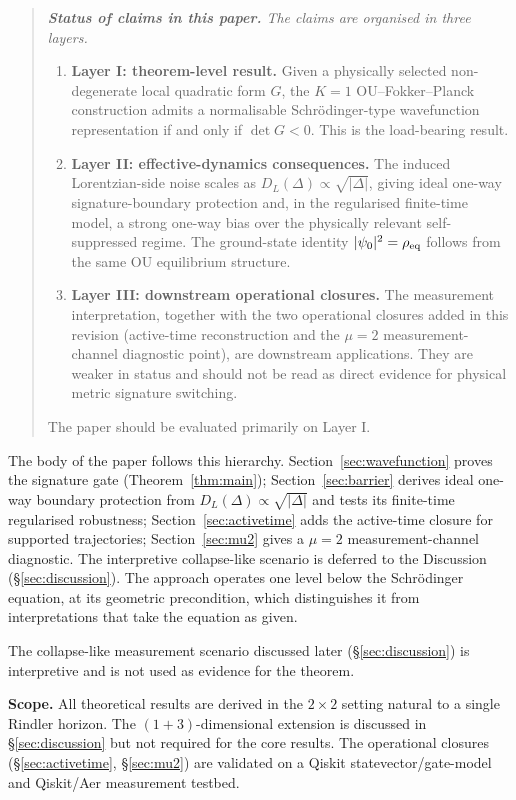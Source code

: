 \documentclass[11pt,a4paper]{article}
\theoremstyle{definition}
\begin{document}
\begin{quote}
\itshape
\textbf{Status of claims in this paper.}
The claims are organised in three layers.
\begin{enumerate}
\item \textbf{Layer I: theorem-level result.}
Given a physically selected non-degenerate local quadratic form $G$,
the $K{=}1$ OU--Fokker--Planck construction admits a normalisable
Schr\"odinger-type wavefunction representation if and only if
$\det G<0$. This is the load-bearing result.
\item \textbf{Layer II: effective-dynamics consequences.}
The induced Lorentzian-side noise scales as
$D_L(\Delta)\propto\sqrt{|\Delta|}$, giving ideal one-way
signature-boundary protection and, in the regularised finite-time model, a
strong one-way bias over the physically relevant self-suppressed regime.
The ground-state identity $|\psi_0|^2=\rho_{\rm eq}$ follows from the
same OU equilibrium structure.
\item \textbf{Layer III: downstream operational closures.}
The measurement interpretation, together with the two operational
closures added in this revision (active-time reconstruction and the
$\mu=2$ measurement-channel diagnostic point), are downstream applications. They are
weaker in status and should not be read as direct evidence for physical
metric signature switching.
\end{enumerate}
The paper should be evaluated primarily on Layer I.
\end{quote}

The body of the paper follows this hierarchy. Section~\ref{sec:wavefunction}
proves the signature gate (Theorem~\ref{thm:main}); Section~\ref{sec:barrier}
derives ideal one-way boundary protection from
$D_L(\Delta)\propto\sqrt{|\Delta|}$ and tests its finite-time regularised
robustness; Section~\ref{sec:activetime} adds the
active-time closure for supported trajectories;
Section~\ref{sec:mu2} gives a $\mu=2$ measurement-channel diagnostic. The interpretive
collapse-like scenario is deferred to the Discussion
(\S\ref{sec:discussion}). The approach
operates one level below the Schr\"odinger equation, at its
geometric precondition, which distinguishes it from interpretations that take the
equation as given.


\noindent The collapse-like measurement scenario discussed later
(\S\ref{sec:discussion}) is interpretive and is not used as evidence for
the theorem.

\medskip\noindent\textbf{Scope.} All theoretical results are derived in the $2\times 2$ setting natural to a single Rindler horizon. The $(1{+}3)$-dimensional extension is discussed in \S\ref{sec:discussion} but not required for the core results. The operational closures (\S\ref{sec:activetime}, \S\ref{sec:mu2}) are validated on a Qiskit statevector/gate-model and Qiskit/Aer measurement testbed.
\end{document}
